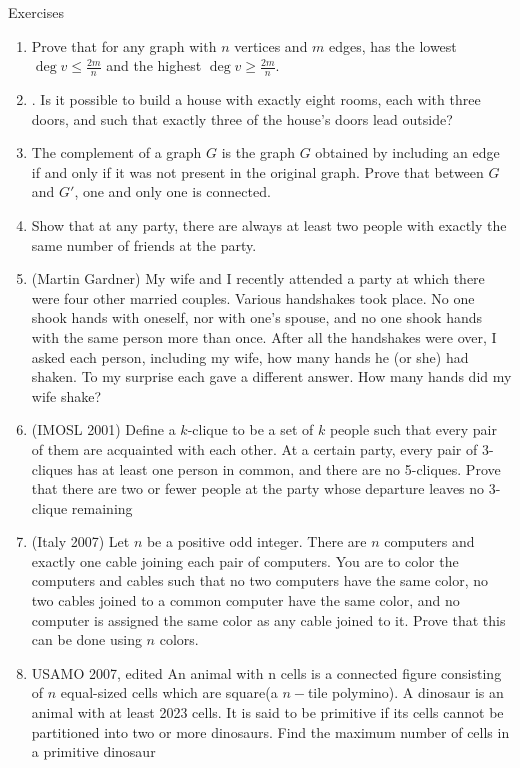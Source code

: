 \begin{xcb}{Exercises}
\begin{enumerate}
        \item Prove that for any graph with $n$ vertices and $m$ edges, has the lowest $\deg v \leq \frac{2m}{n}$ and the highest $\deg v \geq \frac{2m}{n}$.
        \item . Is it possible to build a house with exactly eight rooms, each with three doors, and such that exactly three of the house’s doors lead outside?
        \item The complement of a graph $G$ is the graph $G$ obtained by including an edge if and only if it was not present in the original graph. Prove that between $G$ and $G'$, one and only one is connected.
        \item Show that at any party, there are always at least two people with exactly the same number of friends at the party.
        \item(Martin Gardner) My wife and I recently attended a party at which there were four other married couples. Various handshakes took place. No one shook hands with oneself, nor with one's spouse, and no one shook hands with the same person more than once. After all the handshakes were over, I asked each person, including my wife, how many hands he (or she) had shaken. To my surprise each gave a different answer. How many hands did my wife shake?
        \item(IMOSL 2001) Define a $k$-clique to be a set of $k$ people such that every pair of them are acquainted with each other. At a certain party, every pair of 3-cliques has at least one person in common, and there are no 5-cliques. Prove that there are two or fewer people at the party whose departure leaves no 3-clique remaining
        \item (Italy 2007) Let $n$ be a positive odd integer. There are $n$ computers and exactly one cable joining each pair of computers. You are to color the computers and cables such that no two computers have the same color, no two cables joined to a common computer have the same color, and no computer is assigned the same color as any cable joined to it. Prove that this can be done using $n$ colors.
        \item {USAMO 2007, edited} An animal with n cells is a connected figure consisting of $n$ equal-sized cells which are square(a $n-$tile polymino). A dinosaur is an animal with at least 2023 cells. It is said to be primitive if its cells cannot be partitioned into two or more dinosaurs. Find the maximum number of cells in a primitive dinosaur

\end{enumerate}
\end{xcb}
